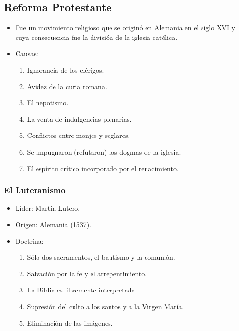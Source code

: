 \subsection{Reforma Protestante}

\begin{itemize}

\item Fue un movimiento religioso que se originó en Alemania en el siglo XVI y cuya consecuencia fue la división de la iglesia católica.

\item Causas:
\begin{enumerate}
	\item Ignorancia de los clérigos.
	\item Avidez de la curia romana.
	\item El nepotismo.
	\item La venta de indulgencias plenarias.
	\item Conflictos entre monjes y seglares.
	\item Se impugnaron (refutaron) los dogmas de la iglesia.
	\item El espíritu crítico  incorporado por el renacimiento.
\end{enumerate}

\end{itemize}

\subsubsection{El Luteranismo}

\begin{itemize}

\item Líder: Martín Lutero.
\item Origen: Alemania (1537).

\item Doctrina:
\begin{enumerate}
	\item Sólo dos sacramentos, el bautismo y la comunión.
	\item Salvación por la fe y el arrepentimiento.
	\item La Biblia es libremente interpretada.
	\item Supresión del culto a los santos y a la Virgen María.
	\item Eliminación de las imágenes.
\end{enumerate}

\end{itemize}

